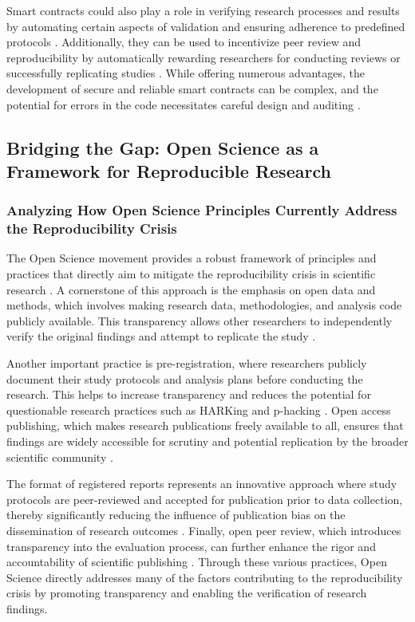 \documentclass{article}
\begin{document}
Smart contracts could also play a role in verifying research processes and results by automating certain aspects of validation and ensuring adherence to predefined protocols \cite{bartling2014opening}. Additionally, they can be used to incentivize peer review and reproducibility by automatically rewarding researchers for conducting reviews or successfully replicating studies \cite{szabo1997formalizing}. While offering numerous advantages, the development of secure and reliable smart contracts can be complex, and the potential for errors in the code necessitates careful design and auditing \cite{wood2015ethereum}.

\subsection{Bridging the Gap: Open Science as a Framework for Reproducible Research}

\subsubsection{Analyzing How Open Science Principles Currently Address the Reproducibility Crisis}

The Open Science movement provides a robust framework of principles and practices that directly aim to mitigate the reproducibility crisis in scientific research \cite{simmons2011false}. A cornerstone of this approach is the emphasis on open data and methods, which involves making research data, methodologies, and analysis code publicly available. This transparency allows other researchers to independently verify the original findings and attempt to replicate the study \cite{fecher2014open}.

Another important practice is pre-registration, where researchers publicly document their study protocols and analysis plans before conducting the research. This helps to increase transparency and reduces the potential for questionable research practices such as HARKing and p-hacking \cite{simmons2011false}. Open access publishing, which makes research publications freely available to all, ensures that findings are widely accessible for scrutiny and potential replication by the broader scientific community \cite{fecher2014open}.

The format of registered reports represents an innovative approach where study protocols are peer-reviewed and accepted for publication prior to data collection, thereby significantly reducing the influence of publication bias on the dissemination of research outcomes \cite{simmons2011false}. Finally, open peer review, which introduces transparency into the evaluation process, can further enhance the rigor and accountability of scientific publishing \cite{simmons2011false}. Through these various practices, Open Science directly addresses many of the factors contributing to the reproducibility crisis by promoting transparency and enabling the verification of research findings.
\end{document}
